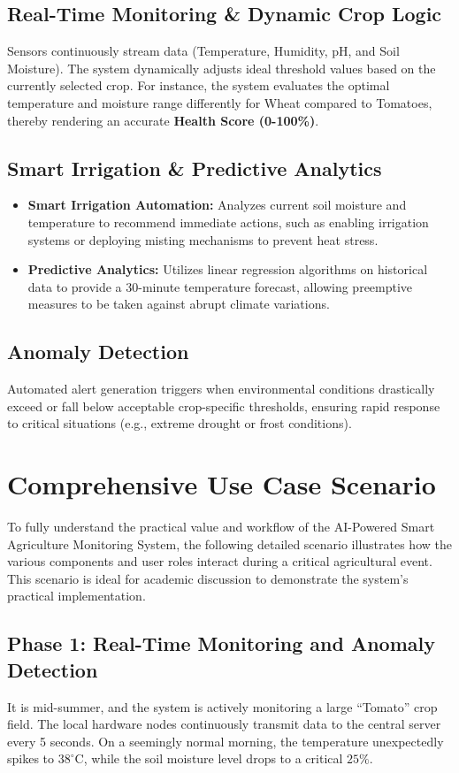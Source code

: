 \documentclass[12pt,a4paper]{article}
\begin{document}
\subsection{Real-Time Monitoring \& Dynamic Crop Logic}
Sensors continuously stream data (Temperature, Humidity, pH, and Soil Moisture). The system dynamically adjusts ideal threshold values based on the currently selected crop. For instance, the system evaluates the optimal temperature and moisture range differently for Wheat compared to Tomatoes, thereby rendering an accurate \textbf{Health Score (0-100\%)}.

\subsection{Smart Irrigation \& Predictive Analytics}
\begin{itemize}
    \item \textbf{Smart Irrigation Automation:} Analyzes current soil moisture and temperature to recommend immediate actions, such as enabling irrigation systems or deploying misting mechanisms to prevent heat stress.
    \item \textbf{Predictive Analytics:} Utilizes linear regression algorithms on historical data to provide a 30-minute temperature forecast, allowing preemptive measures to be taken against abrupt climate variations.
\end{itemize}

\subsection{Anomaly Detection}
Automated alert generation triggers when environmental conditions drastically exceed or fall below acceptable crop-specific thresholds, ensuring rapid response to critical situations (e.g., extreme drought or frost conditions).

\section{Comprehensive Use Case Scenario}
To fully understand the practical value and workflow of the AI-Powered Smart Agriculture Monitoring System, the following detailed scenario illustrates how the various components and user roles interact during a critical agricultural event. This scenario is ideal for academic discussion to demonstrate the system's practical implementation.

\subsection{Phase 1: Real-Time Monitoring and Anomaly Detection}
It is mid-summer, and the system is actively monitoring a large ``Tomato'' crop field. The local hardware nodes continuously transmit data to the central server every 5 seconds. On a seemingly normal morning, the temperature unexpectedly spikes to $38^\circ$C, while the soil moisture level drops to a critical $25\%$. 
\end{document}
